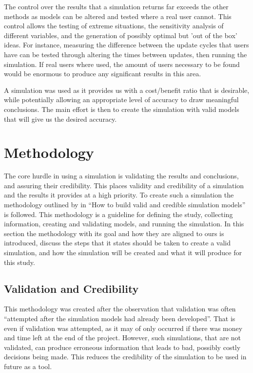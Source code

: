 The control over the results that a simulation returns far exceeds the other methods as models can be altered and tested where a real user cannot. 
This control allows the testing of extreme situations, the sensitivity analysis of different variables,
and the generation of possibly optimal but 'out of the box' ideas. 
For instance, measuring the difference between the update cycles that users have can be tested through altering the times between updates, then running the simulation.
If real users where used, the amount of users necessary to be found would be enormous to produce any significant results in this area.

A simulation was used as it provides us with a cost/benefit ratio that is desirable, while potentially allowing an appropriate level of accuracy to draw meaningful conclusions.
The main effort is then to create the simulation with valid models that will give us the desired accuracy.

\section{Methodology}
{}The core hurdle in using a simulation is validating the results and conclusions, and assuring their credibility.
{}This places validity and credibility of a simulation and the results it provides at a high priority.
{}To create such a simulation the methodology outlined by \cite{Law2005} in ``How to build valid and credible simulation models'' is followed.
{}This methodology is a guideline for defining the study, collecting information, creating and validating models, and running the simulation.
{}In this section the methodology with its goal and how they are aligned to ours is introduced, 
{}discuss the steps that it states should be taken to create a valid simulation, and how the simulation will be created and what it will produce for this study.

\subsection{Validation and Credibility}
This methodology was created after the observation that validation was often ``attempted after the simulation models had already been developed''.
That is even if validation was attempted, as it may of only occurred if there was money and time left at the end of the project.
However, such simulations, that are not validated, can produce erroneous information that leads to bad, possibly costly decisions being made.
This reduces the credibility of the simulation to be used in future as a tool.

